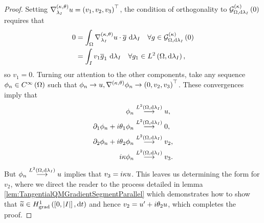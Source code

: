 \begin{proof}
	Setting $\nabla^{\left( \kappa, \theta \right)}_{\lambda_I}u = \left( v_1,v_2,v_3 \right)^{\top}$, the condition of orthogonality to $\mathcal{G}_{ \Omega, \mathrm{d}\lambda_I}^{(\kappa)}\left( 0 \right)$ requires that
	\begin{align*}
		0 &= \int_{\Omega}\nabla^{\left( \kappa, \theta \right)}_{\lambda_I}u \cdot \overline{g} \ \mathrm{d}\lambda_I \quad \forall g\in\mathcal{G}_{ \Omega, \mathrm{d}\lambda_I}^{(\kappa)}\left( 0 \right) \\
		&= \int_{I}v_1 \overline{g}_1 \ \mathrm{d}\lambda_{I} \quad \forall g_1\in L^{2}\left( \Omega,\mathrm{d}\lambda_I \right),
	\end{align*}
	so $v_1=0$.
	Turning our attention to the other components, take any sequence $\phi_n\in C^{\infty}\left( \Omega \right)$ such that $\phi_n\rightarrow u, \nabla^{\left( \kappa, \theta \right)}\phi_n\rightarrow \left( 0,v_2,v_3 \right)^\top$.
	These convergences imply that
	\begin{align*}
		\phi_n &\overset{L^{2}\left( \Omega,\mathrm{d}\lambda_I \right)}{\longrightarrow} u, \\
		\partial_1\phi_n + i\theta_1 \phi_n &\overset{L^{2}\left( \Omega,\mathrm{d}\lambda_I \right)}{\longrightarrow} 0, \\
		\partial_2\phi_n + i\theta_2 \phi_n &\overset{L^{2}\left( \Omega,\mathrm{d}\lambda_I \right)}{\longrightarrow} v_2, \\
		i\kappa\phi_n &\overset{L^{2}\left( \Omega,\mathrm{d}\lambda_I \right)}{\longrightarrow} v_3.
	\end{align*}
	But $\phi_n \overset{L^{2}\left( \Omega,\mathrm{d}\lambda_I \right)}{\longrightarrow} u$ implies that $v_3 = i\kappa u$.
	This leaves us determining the form for $v_2$, where we direct the reader to the process detailed in lemma \ref{lem:TangentialQMGradientSegmentParallel} which demonstrates how to show that $\widetilde{u}\in H^1_\mathrm{grad}\left( \left[ 0,\left\lvert I \right\rvert \right], \mathrm{d}t \right)$ and hence $v_2 = u' + i\theta_2 u$, which completes the proof.
\end{proof}

